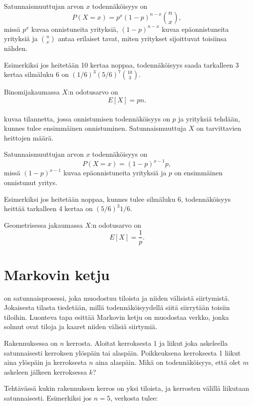 Satunnaismuuttujan arvon $x$ todennäköisyys on
\[P(X=x)=p^x (1-p)^{n-x} {n \choose x},\]
missä $p^x$ kuvaa onnistuneita yrityksiä,
$(1-p)^{n-x}$ kuvaa epäonnistuneita yrityksiä
ja ${n \choose x}$ antaa erilaiset tavat,
miten yritykset sijoittuvat toisiinsa nähden.

Esimerkiksi jos heitetään 10 kertaa noppaa,
todennäköisyys saada tarkalleen 3 kertaa silmäluku 6
on $(1/6)^3 (5/6)^7 {10 \choose 3}$.

Binomijakaumassa $X$:n odotusarvo on
\[E[X] = pn.\]
~\\
 kuvaa tilannetta,
jossa onnistumisen todennäköisyys on $p$
ja yrityksiä tehdään, kunnes tulee ensimmäinen
onnistuminen. Satunnaismuuttuja $X$ on
tarvittavien heittojen määrä.

Satunnaismuuttujan arvon $x$ todennäköisyys on
\[P(X=x)=(1-p)^{x-1} p,\]
missä $(1-p)^{x-1}$ kuvaa epäonnistuneita yrityksiä ja
$p$ on ensimmäinen onnistunut yritys.

Esimerkiksi jos heitetään noppaa,
kunnes tulee silmäluku 6, todennäköisyys
heittää tarkalleen 4 kertaa on $(5/6)^3 1/6$.

Geometrisessa jakaumassa $X$:n odotusarvo on
\[E[X]=\frac{1}{p}.\]

\section{Markovin ketju}


 on satunnaisprosessi,
joka muodostuu tiloista ja niiden välisistä siirtymistä.
Jokaisesta tilasta tiedetään, millä todennäköisyydellä
siitä siirrytään toisiin tiloihin.
Luonteva tapa esittää Markovin ketju on
muodostaa verkko, jonka solmut ovat tiloja
ja kaaret niiden välisiä siirtymiä.

\begin{task}
Rakennuksessa on $n$ kerrosta.
Aloitat kerroksesta 1 ja liikut joka askeleella
satunnaisesti kerroksen ylöspäin tai alaspäin.
Poikkeuksena kerroksesta 1 liikut aina ylöspäin
ja kerroksesta $n$ aina alaspäin.
Mikä on todennäköisyys, että olet $m$
askeleen jälkeen kerroksessa $k$?
\end{task}

Tehtävässä kukin rakennuksen kerros
on yksi tiloista, ja kerrosten välillä liikutaan
satunnaisesti.
Esimerkiksi jos $n=5$, verkosta tulee:

